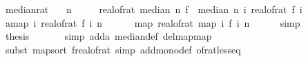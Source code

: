 \begin{isabellebody}
\endisatagproof
{\isafoldproof}%
%
\isadelimproof
\isanewline
%
\endisadelimproof
\isanewline
{}\isamarkupfalse%
\ median{\isacharunderscore}{\kern0pt}rat{\isacharcolon}{\kern0pt}\isanewline
\ \ \ {\isachardoublequoteopen}n\ {\isachargreater}{\kern0pt}\ {}{\isachardoublequoteclose}\isanewline
\ \ \ {\isachardoublequoteopen}real{\isacharunderscore}{\kern0pt}of{\isacharunderscore}{\kern0pt}rat\ {\isacharparenleft}{\kern0pt}median\ n\ f{\isacharparenright}{\kern0pt}\ {\isacharequal}{\kern0pt}\ median\ n\ {\isacharparenleft}{\kern0pt}{\isasymlambda}i{\isachardot}{\kern0pt}\ real{\isacharunderscore}{\kern0pt}of{\isacharunderscore}{\kern0pt}rat\ {\isacharparenleft}{\kern0pt}f\ i{\isacharparenright}{\kern0pt}{\isacharparenright}{\kern0pt}{\isachardoublequoteclose}\isanewline
%
\isadelimproof
%
\endisadelimproof
%
\isatagproof
{}\isamarkupfalse%
\ {\isacharminus}{\kern0pt}\isanewline
\ \ \isamarkupfalse%
\ a{\isacharcolon}{\kern0pt}{\isachardoublequoteopen}map\ {\isacharparenleft}{\kern0pt}{\isasymlambda}i{\isachardot}{\kern0pt}\ real{\isacharunderscore}{\kern0pt}of{\isacharunderscore}{\kern0pt}rat\ {\isacharparenleft}{\kern0pt}f\ i{\isacharparenright}{\kern0pt}{\isacharparenright}{\kern0pt}\ {\isacharbrackleft}{\kern0pt}{}{\isachardot}{\kern0pt}{\isachardot}{\kern0pt}{\isacharless}{\kern0pt}n{\isacharbrackright}{\kern0pt}\ {\isacharequal}{\kern0pt}\ \isanewline
\ \ \ \ map\ real{\isacharunderscore}{\kern0pt}of{\isacharunderscore}{\kern0pt}rat\ {\isacharparenleft}{\kern0pt}map\ {\isacharparenleft}{\kern0pt}{\isasymlambda}i{\isachardot}{\kern0pt}\ f\ i{\isacharparenright}{\kern0pt}\ {\isacharbrackleft}{\kern0pt}{}{\isachardot}{\kern0pt}{\isachardot}{\kern0pt}{\isacharless}{\kern0pt}n{\isacharbrackright}{\kern0pt}{\isacharparenright}{\kern0pt}{\isachardoublequoteclose}\isanewline
\ \ \ \ \isamarkupfalse%
\ {\isacharparenleft}{\kern0pt}simp{\isacharparenright}{\kern0pt}\isanewline
\ \ \isamarkupfalse%
\ {\isacharquery}{\kern0pt}thesis\ \isanewline
\ \ \ \ \isamarkupfalse%
\ {\isacharparenleft}{\kern0pt}simp\ add{\isacharcolon}{\kern0pt}a\ median{\isacharunderscore}{\kern0pt}def\ del{\isacharcolon}{\kern0pt}map{\isacharunderscore}{\kern0pt}map{\isacharparenright}{\kern0pt}\isanewline
\ \ \ \ \isamarkupfalse%
\ {\isacharparenleft}{\kern0pt}subst\ map{\isacharunderscore}{\kern0pt}sort{\isacharbrackleft}{\kern0pt}\ f{\isacharequal}{\kern0pt}{\isachardoublequoteopen}real{\isacharunderscore}{\kern0pt}of{\isacharunderscore}{\kern0pt}rat{\isachardoublequoteclose}{\isacharbrackright}{\kern0pt}{\isacharcomma}{\kern0pt}\ simp\ add{\isacharcolon}{\kern0pt}mono{\isacharunderscore}{\kern0pt}def\ of{\isacharunderscore}{\kern0pt}rat{\isacharunderscore}{\kern0pt}less{\isacharunderscore}{\kern0pt}eq{\isacharparenright}{\kern0pt}\isanewline

\end{isabellebody}
